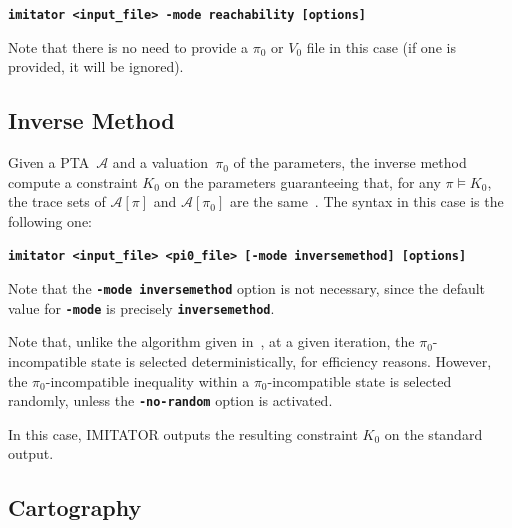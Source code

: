 \documentclass[a4paper,11pt]{report}
\newcommand{\A}{\mathcal{A}}
\newcommand{\imitator}{\textsf{IMITATOR}}
\newcommand{\imitatorExec}{\code{imitator}}
\newcommand{\code}[1]{\textbf{\texttt{#1}}}
\begin{document}
\code{\imitatorExec{} <input\_file> -mode reachability [options]}

Note that there is no need to provide a $\pi_0$ or $V_0$ file in this case (if one is provided, it will be ignored).



\subsection{Inverse Method} \label{ss:mode_inversemethod}

Given a PTA~$\A$ and a valuation~$\pi_0$ of the parameters, the inverse method compute a constraint $K_0$ on the parameters guaranteeing that, for any $\pi \models K_0$, the trace sets of $\A[\pi]$ and $\A[\pi_0]$ are the same~\cite{AS13}.
The syntax in this case is the following one:

\code{\imitatorExec{} <input\_file> <pi0\_file> [-mode inversemethod] [options]}

Note that the \code{-mode inversemethod} option is not necessary, since the default value for \code{-mode} is precisely \code{inversemethod}.

Note that, unlike the algorithm given in~\cite{AS13}, at a given iteration, the $\pi_0$-incompatible state is selected deterministically, for efficiency reasons.
However, the $\pi_0$-incompatible inequality within a $\pi_0$-incompatible state is selected randomly, unless the \code{-no-random} option is activated.

In this case, \imitator{} outputs the resulting constraint $K_0$ on the standard output.


\subsection{Cartography} \label{ss:mode_cartography}
\end{document}
